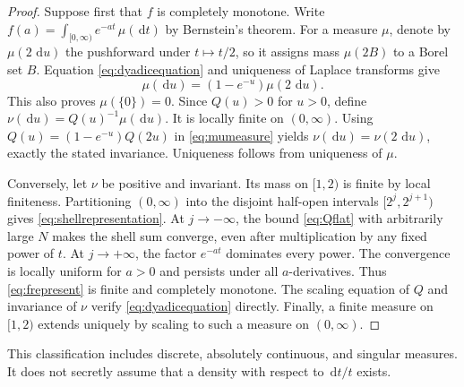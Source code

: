 \documentclass[11pt,letterpaper]{article}
\numberwithin{equation}{section}
\theoremstyle{definition}
\theoremstyle{remark}
\newcommand{\dd}{\,\mathrm d}
\begin{document}
\begin{proof}
Suppose first that $f$ is completely monotone. Write
$f(a)=\int_{[0,\infty)}e^{-at}\,\mu(\dd t)$ by Bernstein's theorem.
For a measure $\mu$, denote by $\mu(2\,\dd u)$ the pushforward under
$t\mapsto t/2$, so it assigns mass $\mu(2B)$ to a Borel set $B$.
Equation \eqref{eq:dyadicequation} and uniqueness of Laplace transforms give
\begin{equation}\label{eq:mumeasure}
 \mu(\dd u)=(1-e^{-u})\mu(2\,\dd u).
\end{equation}
This also proves $\mu(\{0\})=0$.
Since $Q(u)>0$ for $u>0$, define
$\nu(\dd u)=Q(u)^{-1}\mu(\dd u)$. It is locally finite on $(0,\infty)$.
Using $Q(u)=(1-e^{-u})Q(2u)$ in \eqref{eq:mumeasure} yields
$\nu(\dd u)=\nu(2\,\dd u)$, exactly the stated invariance.
Uniqueness follows from uniqueness of $\mu$.

Conversely, let $\nu$ be positive and invariant. Its mass on $[1,2)$ is
finite by local finiteness. Partitioning $(0,\infty)$ into the disjoint
half-open intervals $[2^j,2^{j+1})$ gives \eqref{eq:shellrepresentation}.
At $j\to-\infty$, the bound \eqref{eq:Qflat} with arbitrarily large $N$
makes the shell sum converge, even after multiplication by any fixed
power of $t$. At $j\to+\infty$, the factor $e^{-at}$ dominates every
power. The convergence is locally uniform for $a>0$ and persists under
all $a$-derivatives. Thus \eqref{eq:frepresent} is finite and completely
monotone. The scaling equation of $Q$ and invariance of $\nu$ verify
\eqref{eq:dyadicequation} directly. Finally, a finite measure on $[1,2)$
extends uniquely by scaling to such a measure on $(0,\infty)$.
\end{proof}

This classification includes discrete, absolutely continuous, and singular
measures. It does not secretly assume that a density with respect to
$\dd t/t$ exists.
\end{document}
